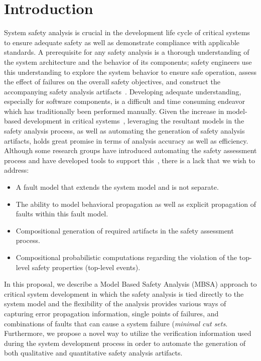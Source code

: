 \chapter{Introduction}
\label{chap:intro}

System safety analysis is crucial in the development life cycle of critical systems to ensure adequate safety as well as demonstrate compliance with applicable standards. A prerequisite for any safety analysis is a thorough understanding of the system architecture and the behavior of its components; safety engineers use this understanding to explore the system behavior to ensure safe operation, assess the effect of failures on the overall safety objectives, and construct the accompanying safety analysis artifacts~\cite{SAE:ARP4761,SAE:ARP4754A}. Developing adequate understanding, especially for software components, is a difficult and time consuming endeavor which has traditionally been performed manually. Given the increase in model-based development in critical systems~\cite{Joshi05:Dasc,CAV2015:BoCiGrMa,info17:HaLuHo,5979344,Gudemann:2010:FQQ:1909626.1909813}, leveraging the resultant models in the safety analysis process, as well as automating the generation of safety analysis artifacts, holds great promise in terms of analysis accuracy as well as efficiency. Although some research groups have introduced automating the safety assessment process and have developed tools to support this~\cite{Joshi05:SafeComp,CAV2015:BoCiGrMa,10.1007/978-3-319-11936-6-7}, there is a lack that we wish to address: 
\begin{itemize}
\item A fault model that extends the system model and is not separate.
\item The ability to model behavioral propagation as well as explicit propagation of faults within this fault model.
\item Compositional generation of required artifacts in the safety assessment process.
\item Compositional probabilistic computations regarding the violation of the top-level safety properties (top-level events).
\end{itemize}

In this proposal, we describe a Model Based Safety Analysis (MBSA) approach to critical system development in which the safety analysis is tied directly to the system model and the flexibility of the analysis provides various ways of capturing error propagation information, single points of failures, and combinations of faults that can cause a system failure (\textit{minimal cut sets}. Furthermore, we propose a novel way to utilize the verification information used during the system development process in order to automate the generation of both qualitative and quantitative safety analysis artifacts. 

